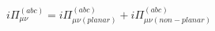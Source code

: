 \begin{equation}
i\Pi_{\mu\nu}^{(abc)}=i\Pi_{\mu\nu(planar)}^{(abc)}+i\Pi_{\mu\nu(non-planar)}^{(abc)}
  \end{equation}

